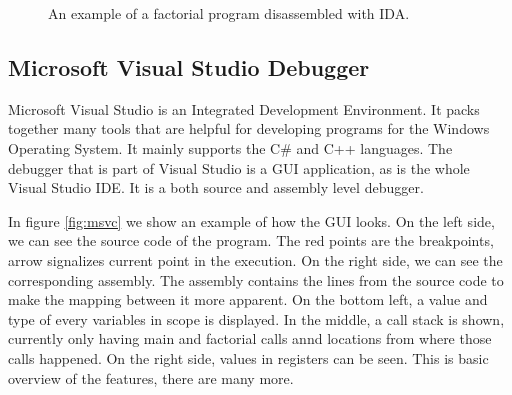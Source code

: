 \begin{figure}
    \caption{An example of a factorial program disassembled with IDA.}
    \label{fig:ida}
\end{figure}

\subsection{Microsoft Visual Studio Debugger}
Microsoft Visual Studio is an Integrated Development Environment. It packs
together many tools that are helpful for developing programs for the Windows
Operating System. It mainly supports the C\# and C++ languages. The debugger
that is part of Visual Studio is a GUI application, as is the whole Visual
Studio IDE. It is a both source and assembly level debugger.

In figure \ref{fig:msvc} we show an example of how the GUI looks. On the left
side, we can see the source code of the program. The red points are the
breakpoints, arrow signalizes current point in the execution. On the right
side, we can see the corresponding assembly. The assembly contains the lines
from the source code to make the mapping between it more apparent. On the
bottom left, a value and type of every variables in scope is displayed. In the
middle, a call stack is shown, currently only having main and factorial calls
annd locations from where those calls happened. On the right side, values in
registers can be seen. This is basic overview of the features, there are many
more.

